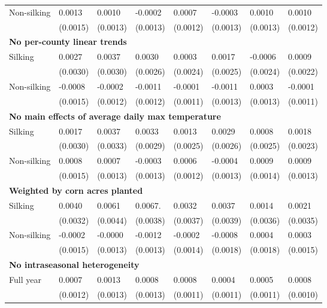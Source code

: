 \begin{table}
\begin{tabular}[t]{llllllll}
\hspace{1em}Non-silking & 0.0013 & 0.0010 & -0.0002 & 0.0007 & -0.0003 & 0.0010 & 0.0010\\
\hspace{1em} & (0.0015) & (0.0013) & (0.0013) & (0.0012) & (0.0013) & (0.0013) & (0.0012)\\
\multicolumn{8}{l}{\textbf{No per-county linear trends}}\\
\hline
\hspace{1em}Silking & 0.0027 & 0.0037 & 0.0030 & 0.0003 & 0.0017 & -0.0006 & 0.0009\\
\hspace{1em} & (0.0030) & (0.0030) & (0.0026) & (0.0024) & (0.0025) & (0.0024) & (0.0022)\\
\hspace{1em}Non-silking & -0.0008 & -0.0002 & -0.0011 & -0.0001 & -0.0011 & 0.0003 & -0.0001\\
\hspace{1em} & (0.0015) & (0.0012) & (0.0012) & (0.0011) & (0.0013) & (0.0013) & (0.0011)\\
\multicolumn{8}{l}{\textbf{No main effects of average daily max temperature}}\\
\hline
\hspace{1em}Silking & 0.0017 & 0.0037 & 0.0033 & 0.0013 & 0.0029 & 0.0008 & 0.0018\\
\hspace{1em} & (0.0030) & (0.0033) & (0.0029) & (0.0025) & (0.0026) & (0.0025) & (0.0023)\\
\hspace{1em}Non-silking & 0.0008 & 0.0007 & -0.0003 & 0.0006 & -0.0004 & 0.0009 & 0.0009\\
\hspace{1em} & (0.0015) & (0.0013) & (0.0013) & (0.0012) & (0.0013) & (0.0014) & (0.0013)\\
\multicolumn{8}{l}{\textbf{Weighted by corn acres planted}}\\
\hline
\hspace{1em}Silking & 0.0040 & 0.0061 & 0.0067. & 0.0032 & 0.0037 & 0.0014 & 0.0021\\
\hspace{1em} & (0.0032) & (0.0044) & (0.0038) & (0.0037) & (0.0039) & (0.0036) & (0.0035)\\
\hspace{1em}Non-silking & -0.0002 & -0.0000 & -0.0012 & -0.0002 & -0.0008 & 0.0004 & 0.0003\\
\hspace{1em} & (0.0015) & (0.0013) & (0.0013) & (0.0014) & (0.0018) & (0.0018) & (0.0015)\\
\multicolumn{8}{l}{\textbf{No intraseasonal heterogeneity}}\\
\hline
\hspace{1em}Full year & 0.0007 & 0.0013 & 0.0008 & 0.0008 & 0.0004 & 0.0005 & 0.0008\\
\hspace{1em} & (0.0012) & (0.0013) & (0.0013) & (0.0011) & (0.0011) & (0.0011) & (0.0010)\\
\hline
\end{tabular}
\end{table}
